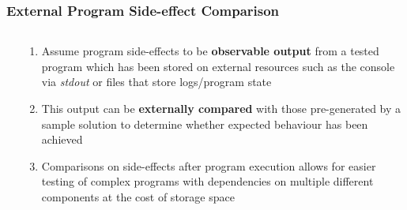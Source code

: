 \documentclass[xcolor]{beamer}
\begin{document}
\begin{frame}
	\frametitle{External Program Side-effect Comparison}
	\begin{columns}
		\begin{column}{0.25\textwidth}
		\end{column}
		\begin{column}{0.7\textwidth}
			\begin{enumerate}
				\setlength\itemsep{0.70em}
				\item Assume program side-effects to be \textbf{observable output} from a tested program which has been stored on external resources such as the console via \textit{stdout} or files that store logs/program state
					\pause
				\item This output can be \textbf{externally compared} with those pre-generated by a sample solution to determine whether expected behaviour has been achieved
					\pause
				\item Comparisons on side-effects after program execution allows for easier testing of complex programs with dependencies on multiple different components at the cost of storage space
			\end{enumerate}
		\end{column}
	\end{columns}
\end{frame}
\end{document}
